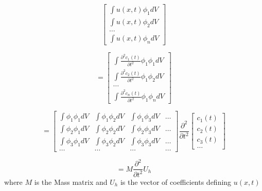$$\begin{bmatrix}
\int u(x,t) \phi_1 dV \\
\int u(x,t) \phi_2 dV \\
\ldots \\
\int u(x,t) \phi_n dV
\end{bmatrix}$$

$$= \begin{bmatrix}
\int \frac{\partial^2 c_1(t)}{\partial t^2} \phi_1 \phi_1 dV \\
\int \frac{\partial^2 c_2(t)}{\partial t^2} \phi_1 \phi_2 dV \\
\ldots \\
\int \frac{\partial^2 c_n(t)}{\partial t^2} \phi_1 \phi_n dV
\end{bmatrix}$$

$$= \begin{bmatrix}
    \int \phi_1 \phi_1 dV & \int \phi_1 \phi_2 dV & \int \phi_1 \phi_3 dV & \ldots \\
    \int \phi_2 \phi_1 dV & \int \phi_2 \phi_2 dV & \int \phi_2 \phi_3 dV & \ldots \\
    \int \phi_3 \phi_1 dV & \int \phi_3 \phi_2 dV & \int \phi_3 \phi_3 dV & \ldots \\
    \ldots & \ldots & \ldots & \ldots 
\end{bmatrix} 
\frac{\partial^2}{\partial t^2} 
\begin{bmatrix}
    c_1(t) \\
    c_2(t) \\
    c_3(t) \\
    \ldots
\end{bmatrix} $$

$$= M \frac{\partial^2}{\partial t^2} U_h$$
where $M$ is the Mass matrix and $U_h$ is the vector of coefficients defining $u(x,t)$


